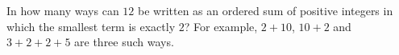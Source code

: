 In how many ways can $12$ be written as an ordered sum of positive integers in which the smallest term is exactly $2$? For example, $2+10$, $10+2$ and $3+2+2+5$ are three such ways.
